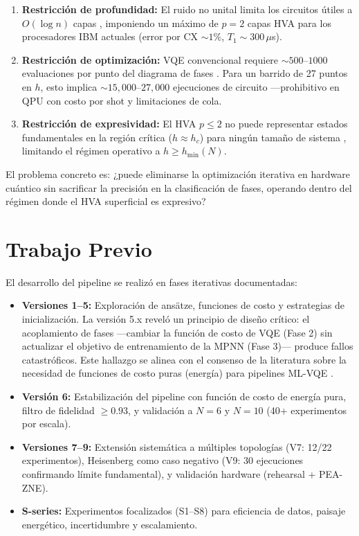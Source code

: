 \documentclass[11pt,a4paper,spanish]{book}
\begin{document}
\begin{enumerate}
    \item \textbf{Restricción de profundidad:} El ruido no unital limita los circuitos útiles a $O(\log n)$ capas \citep{mele2026}, imponiendo un máximo de $p = 2$ capas HVA para los procesadores IBM actuales (error por CX $\sim 1\%$, $T_1 \sim 300\,\mu$s).

    \item \textbf{Restricción de optimización:} VQE convencional requiere $\sim 500$--$1000$ evaluaciones por punto del diagrama de fases \citep{tilly2022}. Para un barrido de 27 puntos en $h$, esto implica $\sim 15{,}000$--$27{,}000$ ejecuciones de circuito ---prohibitivo en QPU con costo por shot y limitaciones de cola.

    \item \textbf{Restricción de expresividad:} El HVA $p \leq 2$ no puede representar estados fundamentales en la región crítica ($h \approx h_c$) para ningún tamaño de sistema \citep{tripathi2026, sumeet2025}, limitando el régimen operativo a $h \geq h_{\min}(N)$.
\end{enumerate}

El problema concreto es: ¿puede eliminarse la optimización iterativa en hardware cuántico sin sacrificar la precisión en la clasificación de fases, operando dentro del régimen donde el HVA superficial es expresivo?

\section{Trabajo Previo}

El desarrollo del pipeline se realizó en fases iterativas documentadas:

\begin{itemize}
    \item \textbf{Versiones 1--5:} Exploración de ansätze, funciones de costo y estrategias de inicialización. La versión 5.x reveló un principio de diseño crítico: el acoplamiento de fases ---cambiar la función de costo de VQE (Fase 2) sin actualizar el objetivo de entrenamiento de la MPNN (Fase 3)--- produce fallos catastróficos. Este hallazgo se alinea con el consenso de la literatura sobre la necesidad de funciones de costo puras (energía) para pipelines ML-VQE \citep{miao2024}.

    \item \textbf{Versión 6:} Estabilización del pipeline con función de costo de energía pura, filtro de fidelidad $\geq 0.93$, y validación a $N = 6$ y $N = 10$ (40+ experimentos por escala).

    \item \textbf{Versiones 7--9:} Extensión sistemática a múltiples topologías (V7: 12/22 experimentos), Heisenberg como caso negativo (V9: 30 ejecuciones confirmando límite fundamental), y validación hardware (rehearsal + PEA-ZNE).

    \item \textbf{S-series:} Experimentos focalizados (S1--S8) para eficiencia de datos, paisaje energético, incertidumbre y escalamiento.
\end{itemize}
\end{document}
